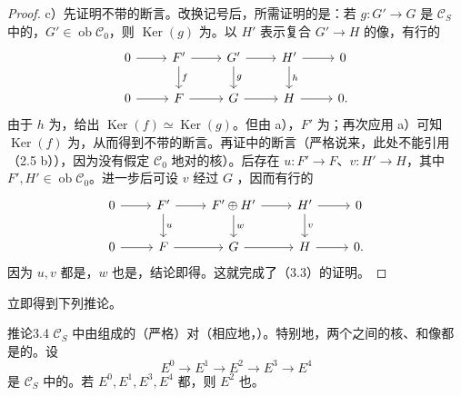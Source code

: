\begin{proof}
c）先证明不带的断言。改换记号后，所需证明的是：若 $g:G'\to G$ 是 $\mathcal C_S$ 中的，$G'\in\operatorname{ob}\mathcal C_0$，则 $\operatorname{Ker}(g)$ 为。以 $H'$ 表示复合 $G'\to H$ 的像，有行的
\[\begin{tikzcd}
0\arrow[r]&F'\arrow[r]\arrow[d,"f"]&G'\arrow[r]\arrow[d,"g"]&H'\arrow[r]\arrow[d,"h"]&0\\
0\arrow[r]&F\arrow[r]&G\arrow[r]&H\arrow[r]&0.
\end{tikzcd}\]
由于 $h$ 为，给出 $\operatorname{Ker}(f)\simeq\operatorname{Ker}(g)$。但由 a），$F'$ 为；再次应用 a）可知 $\operatorname{Ker}(f)$ 为，从而得到不带的断言。再证中的断言（严格说来，此处不能引用（2.5 b）），因为没有假定 $\mathcal C_0$ 地对的核）。后存在 $u:F'\to F$、$v:H'\to H$，其中
$F',H'\in\operatorname{ob}\mathcal C_0$。进一步后可设 $v$ 经过 $G$ ，因而有行的
\[\begin{tikzcd}
0\arrow[r]&F'\arrow[r]\arrow[d,"u"]&F'\oplus H'\arrow[r]\arrow[d,"w"]&H'\arrow[r]\arrow[d,"v"]&0\\
0\arrow[r]&F\arrow[r]&G\arrow[r]&H\arrow[r]&0.
\end{tikzcd}\]
因为 $u,v$ 都是，$w$ 也是，结论即得。这就完成了（3.3）的证明。
\end{proof}

立即得到下列推论。
\begin{SGAresult}{推论}{3.4}
$\mathcal C_S$ 中由组成的（严格）对（相应地，）。特别地，两个之间的核、和像都是的。设
\[E^0\longrightarrow E^1\longrightarrow E^2\longrightarrow E^3\longrightarrow E^4\]
是 $\mathcal C_S$ 中的。若 $E^0,E^1,E^3,E^4$ 都，则 $E^2$ 也。
\end{SGAresult}

